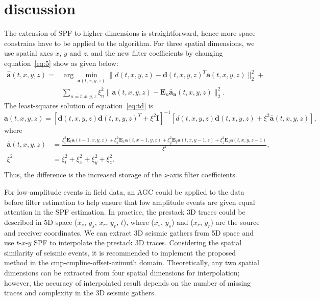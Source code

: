 \section{discussion}
The extension of SPF to higher dimensions is straightforward, hence
more space constrains have to be applied to the algorithm.  For three
spatial dimensions, we use spatial axes $x$, $y$ and $z$, and the new
filter coefficients by changing equation~\ref{eq:5} show as given
below:
\begin{equation}
  \label{eq:td} \begin{aligned} \widehat{\mathbf{a}}(t,x,y,z)=&\arg\min_{\mathbf{a}(t,x,y,z)}\parallel
  d(t,x,y,z)-\mathbf{d}(t,x,y,z)^{T}\mathbf{a}(t,x,y,z)\parallel_{2}^{2}+\\
  &\sum_{n=t,x,y,z}\xi_{n}^2\parallel \mathbf{a}(t,x,y,z)-\mathbf{E}_n\mathbf{\bar{a}_n}(t,x,y,z)\parallel_{2}^{2}.  \end{aligned}
\end{equation}
The least-squares solution of equation~\ref{eq:td} is
\begin{equation}
  \label{eq:az}
  \mathbf{a}(t,x,y,z)=[\mathbf{d}(t,x,y,z)\mathbf{d}(t,x,y,z)^{T}+\xi^2\mathbf{I}]^{-1}
             [d(t,x,y,z)\mathbf{d}(t,x,y,z)+\xi^2\mathbf{\bar{a}}(t,x,y,z)],
\end{equation}
where
\begin{equation}
\begin{aligned}
 \label{eq:baraz}
  \mathbf{\bar{a}}(t,x,y,z)&=\frac{\xi_t^2\mathbf{E}_t\mathbf{a}(t-1,x,y,z)+
  \xi_x^2\mathbf{E}_x\mathbf{a}(t,x-1,y,z)+\xi_y^2\mathbf{E}_y\mathbf{a}(t,x,y-1,z)+\xi_z^2\mathbf{E}_z\mathbf{a}(t,x,y,z-1)}
  {\xi^2},\\
  \xi^2&=\xi_t^2+\xi_x^2+\xi_y^2+\xi_z^2.\\
  \end{aligned}
\end{equation}
Thus, the difference is the increased storage of the $z$-axis
filter coefficients.

For low-amplitude events in field data, an AGC could be applied to the
data before filter estimation to help ensure that low amplitude events
are given equal attention in the SPF estimation. In practice, the
prestack 3D traces could be described in 5D space ($x_s$, $y_s$,
$x_r$, $y_r$, $t$), where ($x_s$, $y_s$) and ($x_r$, $y_r$) are the
source and receiver coordinates. We can extract 3D seismic gathers
from 5D space and use $t$-$x$-$y$ SPF to interpolate the prestack 3D
traces. Considering the spatial similarity of seismic events, it is
recommended to implement the proposed method in the
cmp-cmpline-offset-azimuth domain. Theoretically, any two spatial
dimensions can be extracted from four spatial dimensions for
interpolation; however, the accuracy of interpolated result depends on
the number of missing traces and complexity in the 3D seismic gathers.

